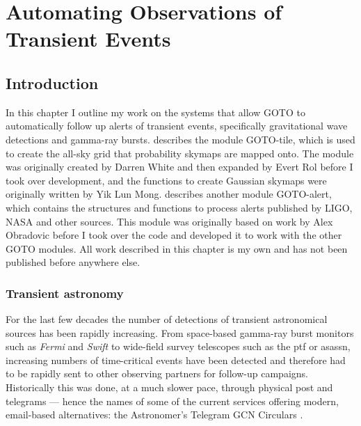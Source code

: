 \chapter{Automating Observations of Transient Events}
\label{chap:events}
\chaptoc{}


\newpage
\section{Introduction}
\label{sec:events_intro}
\begin{colsection}


\begin{colsection}

In this chapter I outline my work on the systems that allow GOTO to automatically follow up alerts of transient events, specifically gravitational wave detections and gamma-ray bursts.  describes the  module GOTO-tile, which is used to create the all-sky grid that probability skymaps are mapped onto. The module was originally created by Darren White and then expanded by Evert Rol before I took over development, and the functions to create Gaussian skymaps were originally written by Yik Lun Mong.  describes another  module GOTO-alert, which contains the structures and functions to process alerts published by LIGO, NASA and other sources. This module was originally based on work by Alex Obradovic before I took over the code and developed it to work with the other GOTO modules. All work described in this chapter is my own and has not been published before anywhere else.

\end{colsection}


\subsection{Transient astronomy}
\label{sec:transient_astronomy}
\begin{colsection}

For the last few decades the number of detections of transient astronomical sources has been rapidly increasing. From space-based gamma-ray burst monitors such as \textit{Fermi} and \textit{Swift} to wide-field survey telescopes such as the \gls{ptf} or \gls{asassn}, increasing numbers of time-critical events have been detected and therefore had to be rapidly sent to other observing partners for follow-up campaigns. Historically this was done, at a much slower pace, through physical post and telegrams --- hence the names of some of the current services offering modern, email-based alternatives: the Astronomer's Telegram \citep{ATel} GCN Circulars \citep{GCN}.


\end{colsection}
\end{colsection}
